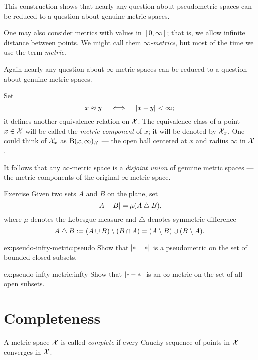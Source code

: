 This construction shows that nearly any question about pseudometric spaces can be reduced to a question about genuine metric spaces.

One may also consider metrics with values in $[0,\infty]$;
that is, we allow infinite distance between points.
We might call them \emph{$\infty$-metrics}, but most of the time we use the term {}\emph{metric}.

Again nearly any question about $\infty$-metric spaces can be reduced to a question about genuine metric spaces. 

Set 
\[x\approx y\quad\iff\quad\dist{x}{y}{}<\infty;\]
it defines another equivalence relation on $\mathcal{X}$.
The equivalence class of a point $x\in\mathcal{X}$ will be called the \emph{metric component} 
 of $x$; it will be denoted by $\mathcal{X}_x$.
One could think of $\mathcal{X}_x$ as  $\mathrm{B}{}(x,\infty)_{\mathcal{X}}$ --- the open ball centered at $x$ and radius $\infty$ in $\mathcal{X}$.

It follows that any $\infty$-metric space is a {}\emph{disjoint union} of genuine metric spaces --- the metric components of the original $\infty$-metric space.

\begin{thm}{Exercise}\label{ex:pseudo-infty-metric}
Given two sets $A$ and $B$ on the plane, set 
\[\dist{A}{B}{}=\mu(A\bigtriangleup B),\]
where $\mu$ denotes the Lebesgue measure and $\bigtriangleup$ denotes symmetric difference
\[A\bigtriangleup B
\mathrel{:=}(A\cup B)\setminus(B\cap A)
=(A\setminus B)\cup(B\setminus A).\]

\begin{subthm}{ex:pseudo-infty-metric:pseudo}
Show that $\dist{*}{*}{}$ is a pseudometric on the set of bounded closed subsets.
\end{subthm}

\begin{subthm}{ex:pseudo-infty-metric:infty}
Show that $\dist{*}{*}{}$ is an $\infty$-metric on the set of all open subsets.
\end{subthm}
\end{thm}

\section{Completeness}

A metric space $\mathcal{X}$ is called \emph{complete} if every Cauchy sequence of points in $\mathcal{X}$ converges in $\mathcal{X}$.

